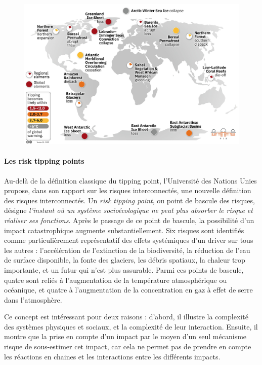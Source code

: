 \begin{figure}
    \centering
    \includegraphics[width=1\linewidth]{figures/Tipping_points_2022_list.jpeg}
    \label{fig:enter-label}
\end{figure}

\paragraph{Les risk tipping points}

Au-delà de la définition classique du tipping point, l'Université des Nations Unies propose, dans son rapport sur les risques interconnectés, une nouvelle définition des risques interconnectés. Un \textit{risk tipping point}, ou point de bascule des risques, désigne \textit{l'instant où un système socioécologique ne peut plus absorber le risque et réaliser ses fonctions}. Après le passage de ce point de bascule, la possibilité d'un impact catastrophique augmente substantiellement. Six risques sont identifiés comme particulièrement représentatif des effets systémiques d'un driver sur tous les autres : l'accélération de l'extinction de la biodiversité, la réduction de l'eau de surface disponible, la fonte des glaciers, les débris spatiaux, la chaleur trop importante, et un futur qui n'est plus assurable. Parmi ces points de bascule, quatre sont  reliés à l'augmentation de la température atmosphérique ou océanique, et quatre à l'augmentation de la concentration en gaz à effet de serre dans l'atmosphère. \cite{united_nations_university_-_institute_for_environment_and_human_security_unu-ehs_interconnected_2023}

Ce concept est intéressant pour deux raisons : d'abord, il illustre la complexité des systèmes physiques et sociaux, et la complexité de leur interaction. Ensuite, il montre que la prise en compte d'un impact par le moyen d'un seul mécanisme risque de sous-estimer cet impact, car cela ne permet pas de prendre en compte les réactions en chaines et les interactions entre les différents impacts. 

